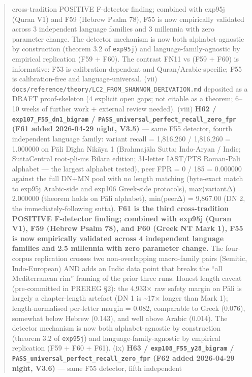 \documentclass[
]{article}
\begin{document}
\begin{quote}
{cross-tradition POSITIVE F-detector finding; combined with exp95j (Quran
V1) and F59 (Hebrew Psalm 78), F55 is now empirically validated across 3
independent language families and 3 millennia with zero parameter
change.} The detector mechanism is now both alphabet-agnostic by
construction (theorem 3.2 of \texttt{exp95j}) and
language-family-agnostic by empirical replication (F59 + F60). The
contrast FN11 vs (F59 + F60) is informative: F53 is
calibration-dependent and Quran/Arabic-specific; F55 is calibration-free
and language-universal. (vii)
\texttt{docs/reference/theory/LC2\_FROM\_SHANNON\_DERIVATION.md}
deposited as a DRAFT proof-skeleton (4 explicit open gaps; not citable
as a theorem; 6--10 weeks of further work + external review needed).
(viii) \textbf{H62 / \texttt{exp107\_F55\_dn1\_bigram} /
\texttt{PASS\_universal\_perfect\_recall\_zero\_fpr} (F61 added
2026-04-29 night, V3.5)} --- same F55 detector, fourth independent
language family: variant recall = 1,816,260 / 1,816,260 = 1.000000 on
Pāli Dīgha Nikāya 1 (Brahmajāla Sutta; Indo-Aryan / Indic; SuttaCentral
root-pli-ms Bilara edition; 31-letter IAST/PTS Roman-Pāli alphabet ---
the largest alphabet tested), peer FPR = 0 / 185 = 0.000000 against the
full DN+MN pool with no length matching (byte-exact match to exp95j
Arabic-side and exp106 Greek-side protocols), max(variantΔ) = 2.000000
(theorem holds on Pāli alphabet), min(peerΔ) = 9,867.00 (DN 2, the
immediately-following sutta). \textbf{F61 is the third cross-tradition
POSITIVE F-detector finding; combined with exp95j (Quran V1), F59
(Hebrew Psalm 78), and F60 (Greek NT Mark 1), F55 is now empirically
validated across 4 independent language families and 2.5 millennia with
zero parameter change.} The four-corpus replication crosses two
non-overlapping macro-family pairs (Semitic, Indo-European) AND adds an
Indic data point that breaks the ``all Mediterranean rim'' framing of
the prior three runs. Honest length caveat (pre-committed in PREREG §2):
the 4,933× raw safety margin on Pāli is largely a chapter-length
artefact (DN 1 is \textasciitilde17× longer than Mark 1);
length-normalised per-letter margin = 0.082, comparable to Greek
(0.076), somewhat below Hebrew (0.143), and well above Arabic (0.014).
The detector mechanism is now both alphabet-agnostic by construction
(theorem 3.2 of \texttt{exp95j}) and language-family-agnostic by
empirical replication (F59 + F60 + F61). (ix) \textbf{H63 /
\texttt{exp108\_F55\_y28\_bigram} /
\texttt{PASS\_universal\_perfect\_recall\_zero\_fpr} (F62 added
2026-04-29 night, V3.6)} --- same F55 detector, fifth independent

\end{quote}
\end{document}
